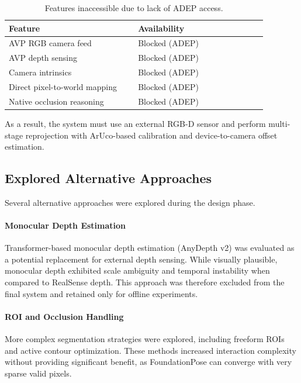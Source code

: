 \documentclass[11pt]{article}
\begin{document}
\begin{table}[H]
    \centering
    \caption{Features inaccessible due to lack of ADEP access.}
    \label{tab:adep_blocked}
    \begin{tabular}{p{0.45\linewidth}p{0.45\linewidth}}
        \toprule
        \textbf{Feature} & \textbf{Availability} \\
        \midrule
        AVP RGB camera feed & Blocked (ADEP) \\
        AVP depth sensing & Blocked (ADEP) \\
        Camera intrinsics & Blocked (ADEP) \\
        Direct pixel-to-world mapping & Blocked (ADEP) \\
        Native occlusion reasoning & Blocked (ADEP) \\
        \bottomrule
    \end{tabular}
\end{table}

As a result, the system must use an external RGB-D sensor and perform multi-stage reprojection with ArUco-based calibration and device-to-camera offset estimation.

\subsection{Explored Alternative Approaches}

Several alternative approaches were explored during the design phase.

\paragraph{Monocular Depth Estimation}
Transformer-based monocular depth estimation (AnyDepth v2) was evaluated as a potential replacement for external depth sensing. While visually plausible, monocular depth exhibited scale ambiguity and temporal instability when compared to RealSense depth. This approach was therefore excluded from the final system and retained only for offline experiments.

\paragraph{ROI and Occlusion Handling}
More complex segmentation strategies were explored, including freeform ROIs and active contour optimization. These methods increased interaction complexity without providing significant benefit, as FoundationPose can converge with very sparse valid pixels.
\end{document}
